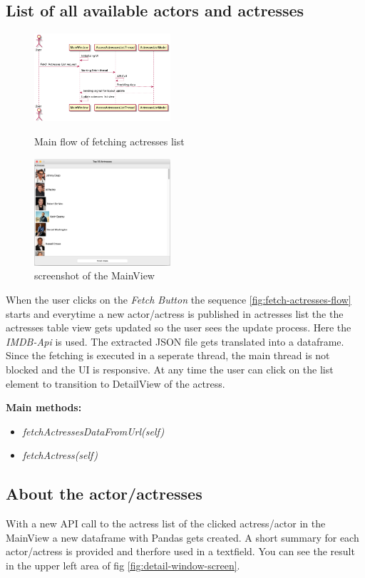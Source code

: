 \documentclass[12pt]{article}
\begin{document}
\subsection{List of all available actors and actresses} \label{list-actors}
\begin{figure}[h]
      \centering
      \includegraphics[width=0.45\textwidth]{img/fetch_actresses_flow.png}
      \caption[width=0.45\textwidth]{\label{fig:fetch-actresses-flow} Main flow of fetching actresses list}
      \includegraphics[width=0.45\textwidth]{img/main-window-screen.png}
      \caption[width=0.45\textwidth]{\label{fig:main-window-screen} screenshot of the MainView}
\end{figure}

When the user clicks on the \textit{Fetch Button} the sequence \ref{fig:fetch-actresses-flow} starts
and everytime a new actor/actress is published in actresses list the the actresses table view gets 
updated so the user sees the update process. Here the \textit{IMDB-Api} is used. The extracted JSON file gets translated into a dataframe. Since the fetching is executed in a seperate thread, the 
main thread is not blocked and the UI is responsive. At any time the user can click on the list element
to transition to DetailView of the actress.

\textbf{Main methods:} 
\begin{itemize}
      \item \textit{fetchActressesDataFromUrl(self)}
      \item \textit{fetchActress(self)}
\end{itemize}


\subsection{About the actor/actresses} \label{about}
With a new API call to the actress list of the clicked actress/actor in the MainView 
a new dataframe with Pandas gets created. A short summary for each actor/actress is provided and
therfore used in a textfield. You can see the result in the upper left area of 
fig \ref{fig:detail-window-screen}.
\end{document}

